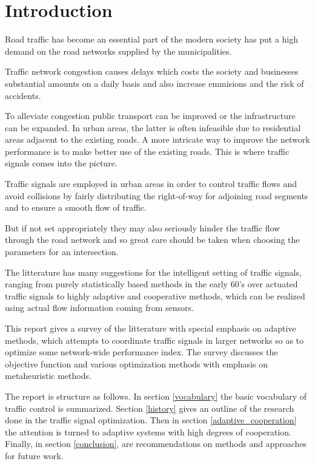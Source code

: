 \section{Introduction}
Road traffic has become an essential part of the modern society has put a high demand on the road networks supplied by the municipalities. 

Traffic network congestion causes delays which costs the society and businesses substantial amounts on a daily basis and also increase emmisions and the risk of accidents.

To alleviate congestion public transport can be improved or the infrastructure can be expanded. In urban areas, the latter is often infeasible due to residential areas adjacent to the existing roads. 
A more intricate way to improve the network performance is to make better use of the existing roads. This is where traffic signals comes into the picture. 

Traffic signals are employed in urban areas in order to control traffic flows and avoid collisions by fairly distributing the right-of-way for adjoining road segments and to ensure a smooth flow of traffic.

But if not set appropriately they may also seriously hinder the traffic flow through the road network and so great care should be taken when choosing the parameters for an intersection. 

The litterature has many suggestions for the intelligent setting of traffic signals, ranging from purely statistically based methods in the early 60's over actuated traffic signals to highly adaptive and cooperative methods, which can be realized using actual flow information coming from sensors. 

This report gives a survey of the litterature with special emphasis on adaptive methods, which attempts to coordinate traffic signals in larger networks so as to optimize some network-wide performance index. The survey discusses the objective function and various optimization methods with emphasis on metaheuristic methods.

The report is structure as follows. In section \ref{vocabulary} the basic vocabulary of traffic control is summarized. Section \ref{history} gives an outline of the research done in the traffic signal optimization. Then in section \ref{adaptive_cooperation} the attention is turned to adaptive systems with high degrees of cooperation.
Finally, in section \ref{conclusion}, are recommendations on methods and approaches for future work.